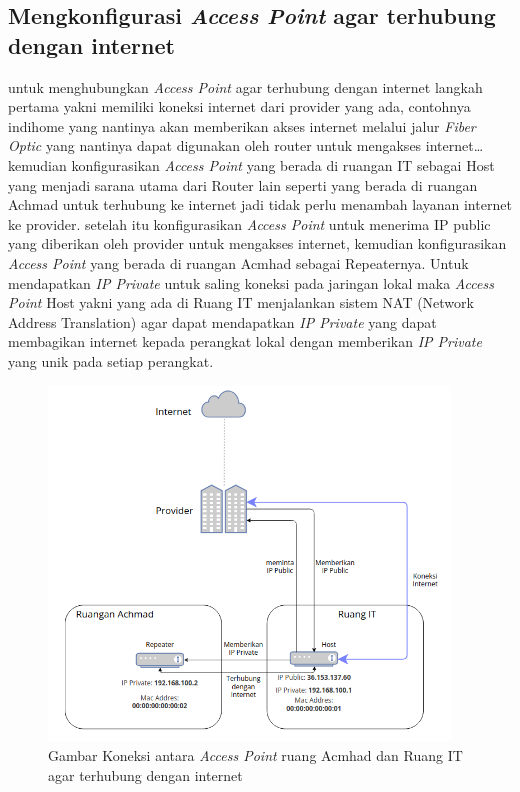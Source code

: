 \documentclass[a4paper, 12pt]{article}
\begin{document}
\subsection{Mengkonfigurasi \textit{Access Point} agar terhubung dengan internet}
untuk menghubungkan \textit{Access Point} agar terhubung dengan internet langkah pertama yakni memiliki koneksi internet dari provider yang ada, contohnya indihome yang nantinya akan memberikan akses internet melalui jalur \textit{Fiber Optic} yang nantinya dapat digunakan oleh router untuk mengakses internet\dots
kemudian konfigurasikan \textit{Access Point} yang berada di ruangan IT sebagai Host yang menjadi sarana utama dari Router lain seperti yang berada di ruangan Achmad untuk terhubung ke internet jadi tidak perlu menambah layanan internet ke provider. setelah itu konfigurasikan \textit {Access Point} untuk menerima IP public yang diberikan oleh provider untuk mengakses internet, kemudian konfigurasikan \textit{Access Point} yang berada di ruangan Acmhad sebagai Repeaternya. Untuk mendapatkan \textit{IP Private} untuk saling koneksi pada jaringan lokal maka \textit{Access Point} Host yakni yang ada di Ruang IT menjalankan sistem NAT (Network Address Translation) agar dapat mendapatkan \textit{IP Private} yang dapat membagikan internet kepada perangkat lokal dengan memberikan \textit{IP Private} yang unik pada setiap perangkat.
\begin{figure}[H]
  \begin{center}
    \includegraphics[width=0.95\textwidth]{images/gambar1_2.png}
  \end{center}
  \caption{Gambar Koneksi antara \textit{Access Point} ruang Acmhad dan Ruang IT agar terhubung dengan internet}\label{fig:accespoint}
\end{figure}
\end{document}
